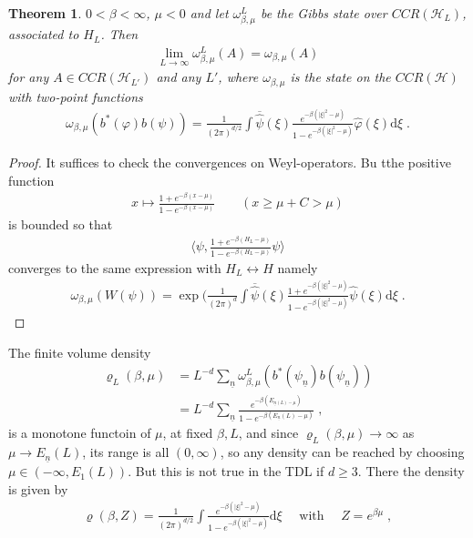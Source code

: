 \documentclass[
a4paper, %
11pt, %
onecolumn, %
openany, %
]{memoir}
\theoremstyle{definition}
\theoremstyle{remark}
\theoremstyle{plain}
\newtheorem{theorem}{Theorem}[chapter]
\begin{document}
	\begin{theorem}
		$0<\beta<\infty$, $\mu<0$ and let $\omega_{\beta,\mu}^L$ be the Gibbs state over $CCR(\mathcal{H}_L)$, associated to $H_L$. Then \begin{align}
		\lim_{L\rightarrow\infty}\omega_{\beta,\mu}^L(A)=\omega_{\beta,\mu}(A)
		\end{align}
		for any $A\in CCR(\mathcal{H}_{L'})$ and any $L'$, where $\omega_{\beta,\mu}$ is the state on the $CCR(\mathcal{H})$ with two-point functions \begin{align}
		\omega_{\beta,\mu}(b^*(\varphi)b(\psi))=\frac{1}{(2\pi)^{d/2}}\int \overline{\hat{\psi}}(\xi)\frac{e^{-\beta(|\xi|^2-\mu)}}{1-e^{-\beta(|\xi|^2-\mu)}}\hat{\varphi}(\xi)\mathrm{d}\xi\; .
		\end{align}
	\end{theorem}
\begin{proof}
	It suffices to check the convergences on Weyl-operators. Bu tthe positive function \begin{align}
	x\mapsto \frac{1+e^{-\beta(x-\mu)}}{1-e^{-\beta(x-\mu)}}\qquad (x\geq \mu+C>\mu)
	\end{align}
	is bounded so that \begin{align}
	\langle \psi, \frac{1+e^{-\beta(H_L-\mu)}}{1-e^{-\beta(H_L-\mu)}}\psi\rangle
	\end{align}
	converges to the same expression with $H_L\leftrightarrow H$ namely \begin{align}
	\omega_{\beta,\mu}(W(\psi))=\exp(\frac{1}{(2\pi)^d}\int \overline{\hat{\psi}}(\xi)\frac{1+e^{-\beta(|\xi|^2-\mu)}}{1-e^{-\beta(|\xi|^2-\mu)}}\hat{\psi}(\xi)\mathrm{d}\xi\; .
	\end{align}
\end{proof}
The finite volume density \begin{align}
\varrho_L(\beta,\mu)&=L^{-d}\sum_{\underline{n}}\omega_{\beta,\mu}^L(b^*(\psi_{\underline{n}})b(\psi_{\underline{n}}))\\
&=L^{-d}\sum_{\underline{n}}\frac{e^{-\beta(E_{\underline{n}(L)-\mu})}}{1-e^{-\beta(E_{\underline{n}}(L)-\mu)}}\; ,
\end{align}
is a monotone functoin of $\mu$, at fixed $\beta, L$, and since $\varrho_L(\beta,\mu)\rightarrow\infty$ as $\mu\rightarrow E_{\underline{n}}(L)$, its range is all $(0,\infty)$, so any density can be reached by choosing $\mu\in(-\infty,E_1(L))$. But this is not true in the TDL if $d\geq 3$. There the density is given by \begin{align}
\varrho(\beta, Z)=\frac{1}{(2\pi)^{d/2}}\int \frac{e^{-\beta(|\xi|^2-\mu)}}{1-e^{-\beta(|\xi|^2-\mu)}}\mathrm{d}\xi \quad\text{ with }\quad Z=e^{\beta\mu}\;,
\end{align}
\end{document}
